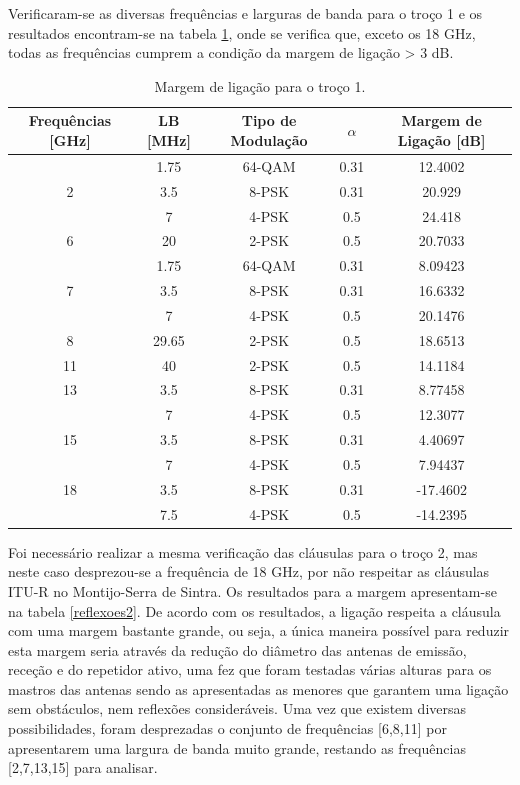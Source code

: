 Verificaram-se as diversas frequências e larguras de banda para o troço 1 e os resultados encontram-se na tabela \ref{reflexoes1}, onde se verifica que, exceto os 18 GHz, todas as frequências cumprem a condição da margem de ligação > 3 dB. 
\begin{table}[H]
\centering
\begin{tabular}{|c|c|c|c|c|}
\hline
Frequências [GHz] & LB [MHz] & Tipo de Modulação & $\alpha$ & Margem de Ligação [dB] \\
\hline
 & 1.75 & 64-QAM & 0.31 & 12.4002\\
2 & 3.5 & 8-PSK & 0.31 & 20.929 \\
 & 7 & 4-PSK & 0.5 & 24.418\\
\hline
 6 & 20 & 2-PSK & 0.5 & 20.7033\\
\hline
 & 1.75 & 64-QAM & 0.31 & 8.09423\\
7 & 3.5 & 8-PSK & 0.31 & 16.6332\\
 &7 & 4-PSK & 0.5 & 20.1476\\
\hline
8 & 29.65 & 2-PSK & 0.5 & 18.6513\\
\hline
11 & 40 & 2-PSK & 0.5 & 14.1184\\
\hline
13 & 3.5 & 8-PSK & 0.31 & 8.77458\\
& 7 & 4-PSK & 0.5 & 12.3077\\
\hline
15 & 3.5 & 8-PSK & 0.31 & 4.40697\\
 & 7 & 4-PSK & 0.5 & 7.94437\\
\hline
18 & 3.5 & 8-PSK & 0.31 & -17.4602\\
& 7.5 & 4-PSK & 0.5 & -14.2395\\ 
\hline
\end{tabular}
\caption{Margem de ligação para o troço 1.}
\label{reflexoes1}
\end{table}
Foi necessário realizar a mesma verificação das cláusulas para o troço 2, mas neste caso desprezou-se a frequência de 18 GHz, por não respeitar as cláusulas ITU-R no Montijo-Serra de Sintra. Os resultados para a margem apresentam-se na tabela \ref{reflexoes2}. De acordo com os resultados, a ligação respeita a cláusula com uma margem bastante grande, ou seja, a única maneira possível para reduzir esta margem seria através da redução do diâmetro das antenas de emissão, receção e do repetidor ativo, uma fez que foram testadas várias alturas para os mastros das antenas sendo as apresentadas as menores que garantem uma ligação sem obstáculos, nem reflexões consideráveis.
Uma vez que existem diversas possibilidades, foram desprezadas o conjunto de frequências [6,8,11] por apresentarem uma largura de banda muito grande, restando as frequências [2,7,13,15] para analisar.  
